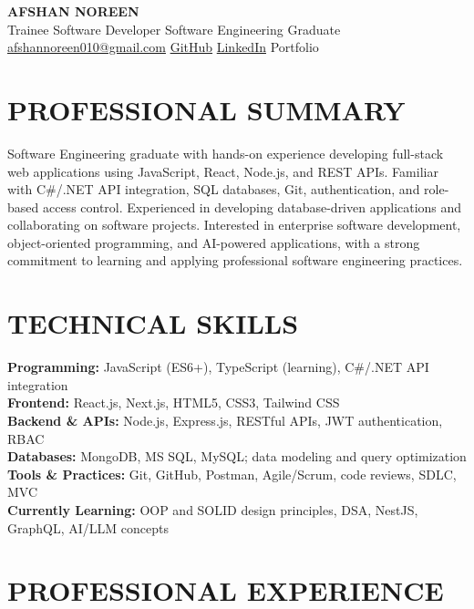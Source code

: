 \documentclass[10pt,a4paper]{article}
\begin{document}
\begin{center}
    {\LARGE \textbf{AFSHAN NOREEN}}\\[3pt]
    {\normalsize Trainee Software Developer \textbar{} Software Engineering Graduate}\\[4pt]
    \small
    \href{mailto:afshannoreen010@gmail.com}{afshannoreen010@gmail.com}
    \textbar{} \href{https://github.com/nooraizafshan}{GitHub}
    \textbar{} \href{https://linkedin.com/in/afshan-noreen}{LinkedIn}
    \textbar{} Portfolio
\end{center}

\section*{PROFESSIONAL SUMMARY}
Software Engineering graduate with hands-on experience developing full-stack web applications using JavaScript, React, Node.js, and REST APIs. Familiar with C\#/.NET API integration, SQL databases, Git, authentication, and role-based access control. Experienced in developing database-driven applications and collaborating on software projects. Interested in enterprise software development, object-oriented programming, and AI-powered applications, with a strong commitment to learning and applying professional software engineering practices.

\section*{TECHNICAL SKILLS}
\textbf{Programming:} JavaScript (ES6+), TypeScript (learning), C\#/.NET API integration\\
\textbf{Frontend:} React.js, Next.js, HTML5, CSS3, Tailwind CSS\\
\textbf{Backend \& APIs:} Node.js, Express.js, RESTful APIs, JWT authentication, RBAC\\
\textbf{Databases:} MongoDB, MS SQL, MySQL; data modeling and query optimization\\
\textbf{Tools \& Practices:} Git, GitHub, Postman, Agile/Scrum, code reviews, SDLC, MVC\\
\textbf{Currently Learning:} OOP and SOLID design principles, DSA, NestJS, GraphQL, AI/LLM concepts

\section*{PROFESSIONAL EXPERIENCE}
\end{document}
